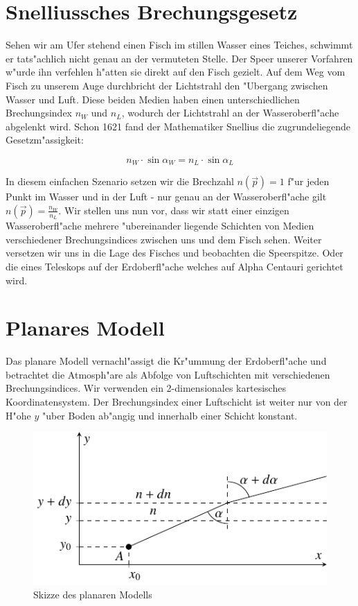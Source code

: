 \begin{refsection}
\section{Snelliussches Brechungsgesetz} 


Sehen wir am Ufer stehend einen Fisch im stillen Wasser eines Teiches, schwimmt er tats"achlich nicht genau an der vermuteten Stelle. 
Der Speer unserer Vorfahren w"urde ihn verfehlen h"atten sie direkt auf den Fisch gezielt.
Auf dem Weg vom Fisch zu unserem Auge durchbricht der Lichtstrahl den "Ubergang zwischen Wasser und Luft. 
Diese beiden Medien haben einen unterschiedlichen Brechungsindex $n_W$ und $n_L$, wodurch der Lichtstrahl an der Wasseroberfl"ache abgelenkt wird.
Schon 1621 fand der Mathematiker Snellius die zugrundeliegende Gesetzm"assigkeit:

\begin{equation} \label{eq:snellius}
n_W \cdot \sin \alpha_W = n_L \cdot \sin \alpha_L 
\end{equation}

In diesem einfachen Szenario setzen wir die Brechzahl $n(\vec{p}) = 1$ f"ur jeden Punkt im Wasser und in der Luft - nur genau an der Wasseroberfl"ache gilt $n(\vec{p}) = \frac{n_W}{n_L}$.
Wir stellen uns nun vor, dass wir statt einer einzigen Wasseroberfl"ache mehrere "ubereinander liegende Schichten von Medien verschiedener Brechungsindices zwischen uns und dem Fisch sehen.
Weiter versetzen wir uns in die Lage des Fisches und beobachten die Speerspitze. 
Oder die eines Teleskops auf der Erdoberfl"ache welches auf Alpha Centauri gerichtet wird.

\section{Planares Modell} 

Das planare Modell vernachl"assigt die Kr"ummung der Erdoberfl"ache und betrachtet die Atmosph"are als Abfolge von Luftschichten mit verschiedenen Brechungsindices. 
Wir verwenden ein 2-dimensionales kartesisches Koordinatensystem. 
Der Brechungsindex einer Luftschicht ist weiter nur von der H"ohe $y$ "uber Boden ab"angig und innerhalb einer Schicht konstant.

\begin{figure}
\centering
\includegraphics{licht/standalone/fig_planar_skizze.pdf}
\caption{Skizze des planaren Modells}
\label{fig:13_1}
\end{figure}


\end{refsection}
